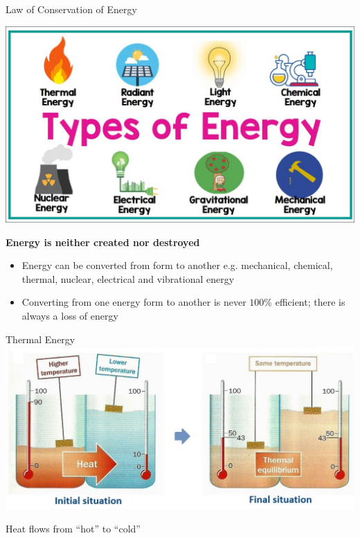 \documentclass[11pt]{beamer}
\begin{document}
\begin{frame}{Law of Conservation of Energy}
  \begin{center}
    \includegraphics[scale=0.15]{energy_types}
    
    \textbf{Energy is neither created nor destroyed}
  \end{center}

  \begin{itemize}
  \item Energy can be converted from form to another
    e.g. mechanical, chemical, thermal, nuclear,
    electrical and vibrational energy
  \item Converting from one energy form to another is
    never $100\%$ efficient; there is always a loss of
    energy
  \end{itemize}
\end{frame}

\begin{frame}{Thermal Energy}
  \centering
  \includegraphics[width=\linewidth]{thermal_equil}

  Heat flows from ``hot'' to ``cold''
\end{frame}
\end{document}
